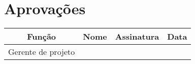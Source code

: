 \section{Aprovações}

\begin{table}[H]
	\begin{tabularx}{\textwidth}{| c | c | X | c |}
		\hline
		\textbf{Função}  & \textbf{Nome}       & \textbf{Assinatura}      & \textbf{Data} \\
		\hline
		Gerente de projeto & \projectManagerName & \projectManagerSignature &               \\
		\hline
	\end{tabularx}
	\centering
\end{table}